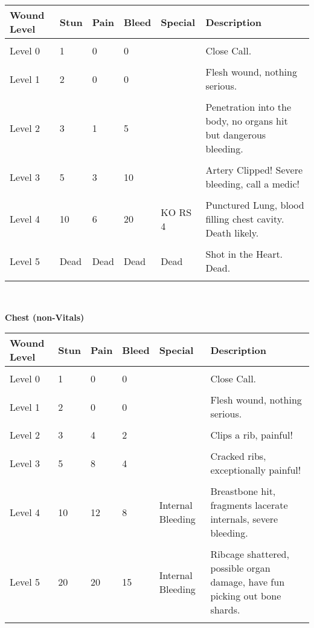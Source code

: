 \documentclass[a4paper, twocolumn, openany]{book}
\begin{document}
{{{\centering
\begin{tabular}{llllp{3cm}p{7cm}}
Wound Level 	& Stun 	& Pain 	& Bleed 	& Special 											& Description \\ \hline \\
Level 0 		& 1 	& 0 	& 0 		&													& Close Call. \\ \\
Level 1 		& 2 	& 0 	& 0 		&													& Flesh wound, nothing serious. \\ \\
Level 2 		& 3 	& 1 	& 5 		& 													& Penetration into the body, no organs hit but dangerous bleeding. \\ \\
Level 3 		& 5 	& 3 	& 10 		& 													& Artery Clipped! Severe bleeding, call a medic! \\ \\
Level 4 		& 10 	& 6 	& 20 		& KO RS 4											& Punctured Lung, blood filling chest cavity. Death likely. \\ \\
Level 5 		& Dead 	& Dead 	& Dead 		& Dead 												& Shot in the Heart. Dead. \\ 
\\ \hline
\end{tabular}\\[\baselineskip] }

{\bfseries Chest (non-Vitals)\\}

{\centering
\begin{tabular}{llllp{3cm}p{7cm}}
Wound Level 	& Stun 	& Pain 	& Bleed 	& Special 											& Description \\ \hline \\
Level 0 		& 1 	& 0 	& 0 		&													& Close Call. \\ \\
Level 1 		& 2 	& 0 	& 0 		&													& Flesh wound, nothing serious. \\ \\
Level 2 		& 3 	& 4 	& 2 		& 													& Clips a rib, painful! \\ \\
Level 3 		& 5 	& 8 	& 4 		& 													& Cracked ribs, exceptionally painful! \\ \\
Level 4 		& 10 	& 12 	& 8 		& Internal Bleeding									& Breastbone hit, fragments lacerate internals, severe bleeding. \\ \\
Level 5 		& 20 	& 20 	& 15 		& Internal Bleeding									& Ribcage shattered, possible organ damage, have fun picking out bone shards. \\ 
\\ \hline
\end{tabular}\\[\baselineskip] }

}}
\end{document}
